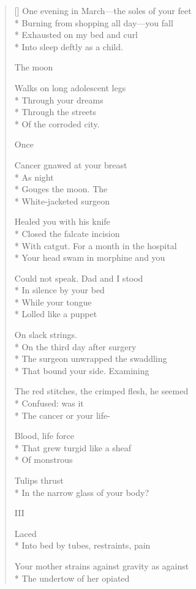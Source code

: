 \begin{verse}[\versewidth]
One evening in March---the soles of your feet\\*
Burning from shopping all day---you fall\\*
Exhausted on my bed and curl\\*
Into sleep deftly as a child.

 \qquad  \qquad  \qquad The moon

Walks on long adolescent legs\\*
Through your dreams\\*
Through the streets\\*
Of the corroded city.

 \qquad  \qquad  \qquad Once

Cancer gnawed at your breast\\*
As night\\*
Gouges the moon.  The \\*
White-jacketed surgeon

Healed you with his knife\\*
Closed the falcate incision\\*
With catgut.  For a month in the hospital\\*
Your head swam in morphine and you

Could not speak.  Dad and I stood\\*
In silence by your bed\\*
While your tongue \\*
Lolled like a puppet

On slack strings.\\*
On the third day after surgery\\*
The surgeon unwrapped the swaddling\\*
That bound your side. \qquad Examining

The red stitches, the crimped flesh, he seemed\\*
Confused: was it\\*
The cancer or your life-

Blood, life force\\*
That grew turgid \qquad like a sheaf\\*
Of monstrous

Tulips thrust\\*
In the narrow glass of your body?

 \qquad  \qquad  \qquad III

 \qquad  \qquad Laced\\*
Into bed by tubes, restraints, pain

Your mother strains against gravity as against\\*
The undertow of her opiated


\end{verse}
